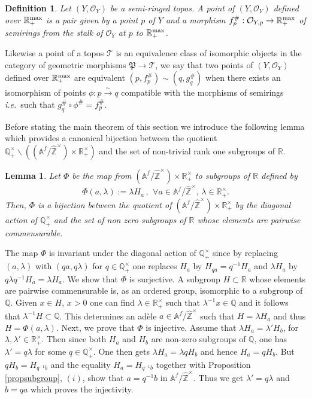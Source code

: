 \documentclass[noams,lp]{compositio}
\newtheorem{defn}[thm]{Definition} %
\newtheorem{lem}[thm]{Lemma}
\def\A{{\mathbb A}}
\def\Q{{\mathbb Q}}
\def\R{{\mathbb R}}
\def\Z{{\mathbb Z}}
\def\pt{\mathfrak P}
\def\cO{{\mathcal O}}
\def\cT{{\mathcal T}}
\def\qqq{\,,\,~\forall}
\newcommand{\ie}{{\it i.e.\/}\ }
\def\rmax{\R_+^{\rm max}}
\def\hatz{{\hat\Z^\times}}
\begin{document}
\begin{defn} \label{defnpt} Let $(Y,\cO_Y)$ be a semi-ringed topos. A point of $(Y,\cO_Y)$ defined over $\rmax$ is a pair given by a point $p$ of $Y$ and a  morphism $f^\#_p: \cO_{Y,p}\to \rmax$ of semirings from the stalk of $\cO_Y$ at $p$ to $\rmax$.  
\end{defn}

Likewise a point of a topos $\cT$  is an equivalence class of isomorphic objects in the category of geometric morphisms $\pt\to \cT$, we say that two  points  of $(Y,\cO_Y)$ defined over $\rmax$  are equivalent $(p,f^\#_p)\sim (q,g^\#_q)$ when there exists an isomorphism of points $\phi:p\stackrel{\sim}{\to} q$ compatible with the morphisms of semirings \ie such that $g^\#_q\circ \phi^\#=f^\#_p$.

Before stating the main theorem of this section we introduce the following lemma which provides a canonical bijection between the quotient $\Q_+^\times\backslash((\A^f/\hatz)\times \R_+^\times)$ and the set of non-trivial rank one subgroups of $\R$.

\begin{lem}\label{subbis} Let $\Phi$ be the map from $(\A^f/\hatz)\times \R_+^\times$ to subgroups of $\R$ defined by 
$$
\Phi(a,\lambda):=\lambda H_a\qqq a\in \A^f/\hatz, \, \lambda \in  \R_+^\times.
$$
Then, $\Phi$ is a bijection between the quotient of $( \A^f/\hatz)\times \R_+^\times$ by the diagonal action of $\Q_+^\times$ and the set of non zero subgroups of $\R$ whose elements are pairwise commensurable.
\end{lem}
\proof The map $\Phi$ is invariant under the diagonal action of $\Q_+^\times$ since by replacing $(a,\lambda)$ with $ (qa,q\lambda)$ for $q\in \Q_+^\times$ one replaces $H_a$ by $H_{qa}=q^{-1}H_a$ and $\lambda H_a$ by 
$q\lambda q^{-1}H_a=\lambda H_a$. \newline
We show that $\Phi$ is surjective. 
A subgroup $H\subset \R$ whose elements are pairwise commensurable is, as an ordered group, isomorphic to a subgroup of $\Q$. Given $x\in H$, $x>0$  one can find  $\lambda\in  \R_+^\times$ such that $\lambda^{-1} x\in \Q$ and it follows that $\lambda^{-1} H\subset \Q$. This determines an ad\`ele  $a\in  \A^f/\hatz$ such that 
$ H=\lambda H_a$ and thus $H=\Phi(a,\lambda)$. \newline
Next, we prove that $\Phi$ is injective. Assume that $\lambda H_a=\lambda' H_b$, for $\lambda, \lambda' \in  \R_+^\times$. Then since both $H_a$ and $H_b$ are non-zero subgroups of $\Q$, one has $\lambda'=q\lambda$ for some $q\in \Q_+^\times$. One then gets $\lambda H_a=\lambda q H_b$ and hence $H_a=q H_b$.  But $q H_b=H_{q^{-1}b}$ and the equality $H_a=H_{q^{-1}b}$ together with Proposition \ref{propsubgroup}, $(i)$, show that $a=q^{-1}b$ in $ \A^f/\hatz$. Thus we get $\lambda'=q\lambda$ and $b=qa$
which proves the injectivity.
\endproof
\end{document}
